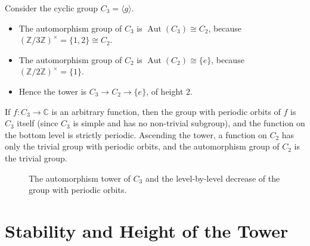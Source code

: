 \begin{example}\label{ex:cyclic_tower_period}
Consider the cyclic group $C_3 = \langle g \rangle$.
\begin{itemize}
    \item The automorphism group of $C_3$ is $\operatorname{Aut}(C_3) \cong C_2$, because $(\mathbb{Z}/3\mathbb{Z})^\times = \{1,2\} \cong C_2$.
    \item The automorphism group of $C_2$ is $\operatorname{Aut}(C_2) \cong \{e\}$, because $(\mathbb{Z}/2\mathbb{Z})^\times = \{1\}$.
    \item Hence the tower is $C_3 \to C_2 \to \{e\}$, of height $2$.
\end{itemize}
If $f: C_3 \to \mathbb{C}$ is an arbitrary function, then the group with periodic orbits of $f$ is $C_3$ itself (since $C_3$ is simple and has no non-trivial subgroup), and the function on the bottom level is strictly periodic. Ascending the tower, a function on $C_2$ has only the trivial group with periodic orbits, and the automorphism group of $C_2$ is the trivial group.
\end{example}

\begin{figure}[htbp]
\centering
{}
\caption{The automorphism tower of $C_3$ and the level-by-level decrease of the group with periodic orbits.}
\label{fig:c3_tower_period}
\end{figure}

\section{Stability and Height of the Tower}

